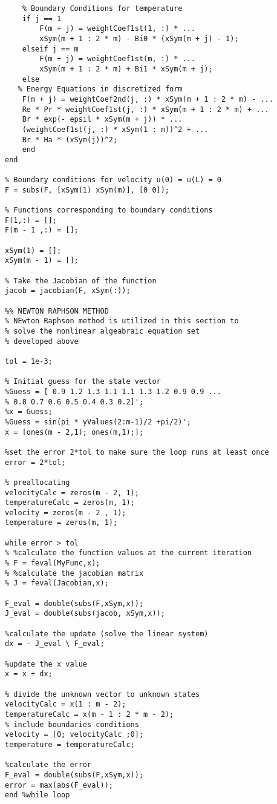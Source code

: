 \begin{lstlisting}
    % Boundary Conditions for temperature
    if j == 1
        F(m + j) = weightCoef1st(1, :) * ...
        xSym(m + 1 : 2 * m) - Bi0 * (xSym(m + j) - 1); 
    elseif j == m
        F(m + j) = weightCoef1st(m, :) * ...
        xSym(m + 1 : 2 * m) + Bi1 * xSym(m + j);       
    else 
   % Energy Equations in discretized form
    F(m + j) = weightCoef2nd(j, :) * xSym(m + 1 : 2 * m) - ...
    Re * Pr * weightCoef1st(j, :) * xSym(m + 1 : 2 * m) + ...
    Br * exp(- epsil * xSym(m + j)) * ...
    (weightCoef1st(j, :) * xSym(1 : m))^2 + ...
    Br * Ha * (xSym(j))^2;
    end
end

% Boundary conditions for velocity u(0) = u(L) = 0
F = subs(F, [xSym(1) xSym(m)], [0 0]);

% Functions corresponding to boundary conditions
F(1,:) = [];
F(m - 1 ,:) = [];

xSym(1) = [];
xSym(m - 1) = [];

% Take the Jacobian of the function
jacob = jacobian(F, xSym(:));

%% NEWTON RAPHSON METHOD
% NEwton Raphson method is utilized in this section to 
% solve the nonlinear algeabraic equation set 
% developed above

tol = 1e-3;

% Initial guess for the state vector
%Guess = [ 0.9 1.2 1.3 1.1 1.1 1.3 1.2 0.9 0.9 ...
% 0.8 0.7 0.6 0.5 0.4 0.3 0.2]';
%x = Guess;
%Guess = sin(pi * yValues(2:m-1)/2 +pi/2)';
x = [ones(m - 2,1); ones(m,1);];

%set the error 2*tol to make sure the loop runs at least once 
error = 2*tol;

% preallocating
velocityCalc = zeros(m - 2, 1);
temperatureCalc = zeros(m, 1);
velocity = zeros(m - 2 , 1);
temperature = zeros(m, 1);

while error > tol
% %calculate the function values at the current iteration
% F = feval(MyFunc,x);
% %calculate the jacobian matrix
% J = feval(Jacobian,x);

F_eval = double(subs(F,xSym,x));
J_eval = double(subs(jacob, xSym,x));

%calculate the update (solve the linear system)
dx = - J_eval \ F_eval;

%update the x value
x = x + dx;

% divide the unknown vector to unknown states
velocityCalc = x(1 : m - 2);
temperatureCalc = x(m - 1 : 2 * m - 2);
% include boundaries conditions
velocity = [0; velocityCalc ;0];
temperature = temperatureCalc;

%calculate the error
F_eval = double(subs(F,xSym,x));
error = max(abs(F_eval));
end %while loop 


\end{lstlisting}
